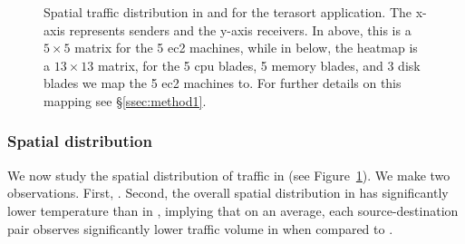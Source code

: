 %
\begin{figure}[t]
  \centering
  \caption{\small{Spatial traffic distribution in \pdis and \dis for the terasort application. The x-axis represents senders and the y-axis receivers. In \pdis above, this is a $5 \times 5$ matrix for the 5 ec2 machines, while in \dis below, the heatmap is a $13 \times 13$ matrix, for the 5 cpu blades, 5 memory blades, and 3 disk blades we map the 5 ec2 machines to. For further details on this mapping see \S\ref{ssec:method1}.}}
  
  \label{fig:sd}
\end{figure}
%
\subsubsection{Spatial distribution}
We now study the spatial distribution of traffic in \dis (see Figure~\ref{fig:sd}). We make two observations. First, . Second, the overall spatial distribution in \dis has significantly lower temperature than in \pdis, implying that on an average, each source-destination pair observes significantly lower traffic volume in \dis when compared to \pdis.


